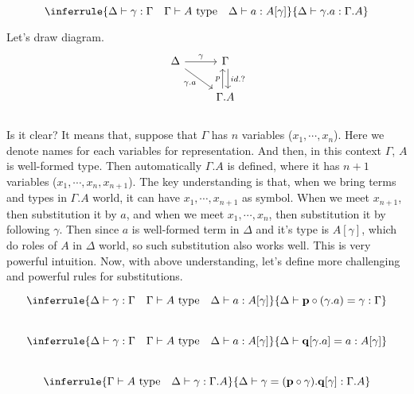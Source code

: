 \documentclass[12pt, a4paper, openany, twoside]{book}
\theoremstyle{definition}
\theoremstyle{remark}
\theoremstyle{plain}
\numberwithin{equation}{section}
\begin{document}
\vspace{4mm}
\begin{tcolorbox}[colback=yellow!10!white,colframe=green!75!black,title=Construction 1.3.10.]\hypertarget{subst extend}{}
\[\inferrule
{\Delta \vdash \gamma : \Gamma \quad \Gamma \vdash A \text{ type} \quad \Delta \vdash a : A[\gamma]}
{\Delta \vdash \gamma.a : \Gamma.A}\]
\end{tcolorbox}
Let's draw diagram. \\
\[
\begin{tikzcd}
    \Delta \arrow[r, "\gamma"] \arrow[rd, "\gamma.a"'] & \Gamma \arrow[d, "id.?", shift left]\\
    & \Gamma.A \arrow[u, "p", shift left]
\end{tikzcd}
\]
\\
Is it clear? It means that, suppose that $\Gamma$ has $n$ variables ($x_1, \cdots, x_n$). Here we denote names for each variables for representation. 
And then, in this context $\Gamma$, $A$ is well-formed type. Then automatically $\Gamma.A$ is defined, where 
it has $n+1$ variables ($x_1, \cdots, x_n, x_{n+1}$). The key understanding is that, when we bring 
terms and types in $\Gamma.A$ world, it can have $x_1, \cdots, x_{n+1}$ as symbol. When we meet $x_{n+1}$, then substitution it by $a$, and when we meet $x_1, \cdots, x_n$, then substitution it by following $\gamma$. 
Then since $a$ is well-formed term in $\Delta$ and it's type is $A[\gamma]$, which do roles of $A$ in $\Delta$ world, so such substitution also works well. This is very powerful intuition. 
Now, with above understanding, let's define more challenging and powerful rules for substitutions. 
\begin{tcolorbox}[colback=yellow!10!white,colframe=green!75!black,title=Construction 1.3.11.]\hypertarget{construction 1.3.11}{}

\[
\inferrule
{\Delta \vdash \gamma : \Gamma \quad \Gamma \vdash A \text{ type} \quad \Delta \vdash a : A[\gamma]}
{\Delta \vdash \mathbf{p} \circ (\gamma.a) = \gamma : \Gamma}
\]
\\
\[
\inferrule
{\Delta \vdash \gamma : \Gamma \quad \Gamma \vdash A \text{ type} \quad \Delta \vdash a : A[\gamma]}
{\Delta \vdash \mathbf{q}[\gamma.a] = a : A[\gamma]}
\]
\\
\[
\inferrule
{\Gamma \vdash A \text{ type} \quad \Delta \vdash \gamma : \Gamma.A}
{\Delta \vdash \gamma = (\mathbf{p}\circ \gamma).\mathbf{q}[\gamma] : \Gamma.A}
\]
\\
\end{tcolorbox} 
\end{document}
